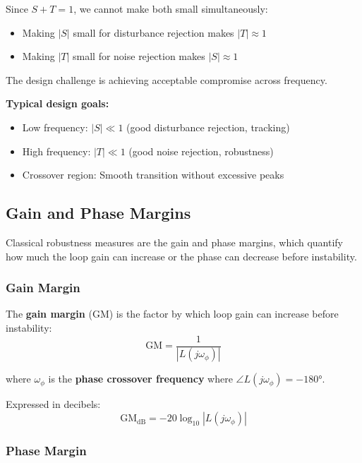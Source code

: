 Since $S + T = 1$, we cannot make both small simultaneously:
\begin{itemize}
    \item Making $|S|$ small for disturbance rejection makes $|T| \approx 1$
    \item Making $|T|$ small for noise rejection makes $|S| \approx 1$
\end{itemize}

The design challenge is achieving acceptable compromise across frequency.

\textbf{Typical design goals:}
\begin{itemize}
    \item Low frequency: $|S| \ll 1$ (good disturbance rejection, tracking)
    \item High frequency: $|T| \ll 1$ (good noise rejection, robustness)
    \item Crossover region: Smooth transition without excessive peaks
\end{itemize}

\subsection{Gain and Phase Margins}

Classical robustness measures are the gain and phase margins, which quantify how much the loop gain can increase or the phase can decrease before instability.

\subsubsection{Gain Margin}

The \textbf{gain margin} (GM) is the factor by which loop gain can increase before instability:
\begin{equation}
\text{GM} = \frac{1}{|L(j\omega_{\phi})|}
\label{eq:gain_margin}
\end{equation}

where $\omega_{\phi}$ is the \textbf{phase crossover frequency} where $\angle L(j\omega_{\phi}) = -180°$.

Expressed in decibels:
\begin{equation}
\text{GM}_{\text{dB}} = -20\log_{10}|L(j\omega_{\phi})|
\label{eq:gain_margin_db}
\end{equation}

\subsubsection{Phase Margin}

